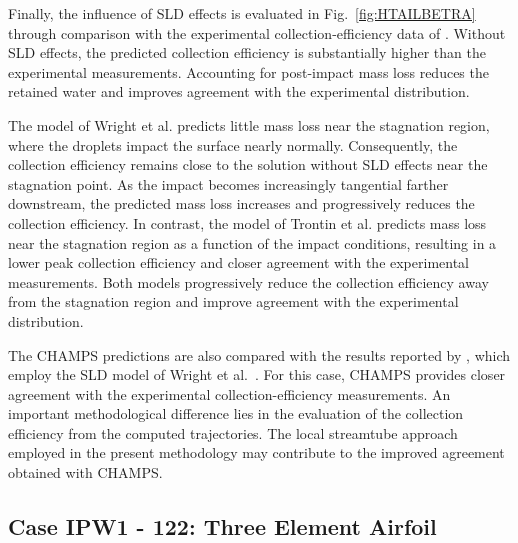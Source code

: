 Finally, the influence of SLD effects is evaluated in Fig.~\ref{fig:HTAILBETRA} through comparison with the experimental collection-efficiency data of \cite{papadakism2004water}. Without SLD effects, the predicted collection efficiency is substantially higher than the experimental measurements. Accounting for post-impact mass loss reduces the retained water and improves agreement with the experimental distribution.

The model of Wright et al.\cite{wright2004semi} predicts little mass loss near the stagnation region, where the droplets impact the surface nearly normally. Consequently, the collection efficiency remains close to the solution without SLD effects near the stagnation point. As the impact becomes increasingly tangential farther downstream, the predicted mass loss increases and progressively reduces the collection efficiency. In contrast, the model of Trontin et al.\cite{trontin2016revisited} predicts mass loss near the stagnation region as a function of the impact conditions, resulting in a lower peak collection efficiency and closer agreement with the experimental measurements. Both models progressively reduce the collection efficiency away from the stagnation region and improve agreement with the experimental distribution.

The CHAMPS predictions are also compared with the results reported by \cite{bellosta2023lagrangian}, which employ the SLD model of Wright et al.~\cite{wright2004semi}. For this case, CHAMPS provides closer agreement with the experimental collection-efficiency measurements. An important methodological difference lies in the evaluation of the collection efficiency from the computed trajectories. The local streamtube approach employed in the present methodology may contribute to the improved agreement obtained with CHAMPS.

\FloatBarrier

\subsection{Case IPW1 - 122: Three Element Airfoil}

